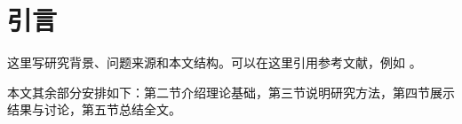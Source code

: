 \section{引言}

这里写研究背景、问题来源和本文结构。可以在这里引用参考文献，例如 \cite{lamport1994latex}。

本文其余部分安排如下：第二节介绍理论基础，第三节说明研究方法，第四节展示结果与讨论，第五节总结全文。
